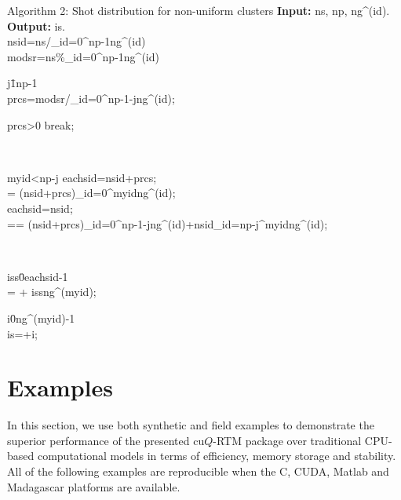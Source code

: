 \begin{algorithm}{Algorithm 2: Shot distribution for non-uniform clusters}{}
     \textbf{Input:}  ns,  np,  ng^{(id)}. \\
     \textbf{Output:}   is. \\
     nsid=ns/\sum_{id=0}^{np-1}{ng^{(id)}}\\
     modsr=ns\%\sum_{id=0}^{np-1}{ng^{(id)}} \\
    \begin{FOR}{j\=1\cdots np-1} \\
    prcs=modsr/\sum_{id=0}^{np-1-j}{ng^{(id)}}; \\ 
    \begin{IF}{prcs>0} 
		break;
    \end{IF} \\
    \end{FOR}
    \begin{IF}{myid<np-j} 
     eachsid=nsid+prcs;\\
      = (nsid+prcs)\times \sum_{id=0}^{myid}{ng^{(id)}};\\
    \ELSE
    eachsid=nsid;\\
    == (nsid+prcs)\times \sum_{id=0}^{np-1-j}{ng^{(id)}}+nsid\times \sum_{id=np-j}^{myid}{ng^{(id)}};
    \end{IF} \\
    \begin{FOR}{iss\=0\cdots eachsid-1} \\
     =  + iss\times ng^{(myid)}; \\ 
    \begin{FOR}{i\=0\cdots ng^{(myid)}-1} \\
    is=+i; 
    \end{FOR}
    \end{FOR}
\end{algorithm}



\section{Examples}

In this section, we use both synthetic and field examples to demonstrate the superior performance of the presented cu$Q$-RTM package over traditional CPU-based computational models in terms of efficiency, memory storage and stability. All of the following examples are reproducible when the C, CUDA, Matlab and Madagascar platforms \citep{Fomel2013Madagascar} are available. 

